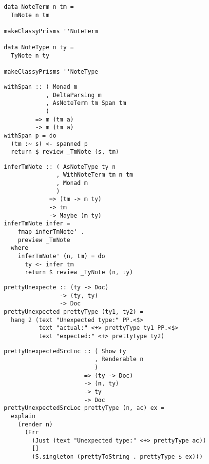 \documentclass{beamer}
\begin{document}
\begin{frame}[fragile]
  \begin{verbatim}
data NoteTerm n tm =
  TmNote n tm

makeClassyPrisms ''NoteTerm

data NoteType n ty =
  TyNote n ty

makeClassyPrisms ''NoteType
  \end{verbatim}
\end{frame} 

\begin{frame}[fragile]
  \begin{verbatim}
withSpan :: ( Monad m
            , DeltaParsing m
            , AsNoteTerm tm Span tm
            )
         => m (tm a)
         -> m (tm a)
withSpan p = do
  (tm :~ s) <- spanned p
  return $ review _TmNote (s, tm)
  \end{verbatim}
\end{frame} 

\begin{frame}[fragile]
  \begin{verbatim}
inferTmNote :: ( AsNoteType ty n
               , WithNoteTerm tm n tm
               , Monad m
               )
             => (tm -> m ty)
             -> tm
             -> Maybe (m ty)
inferTmNote infer =
    fmap inferTmNote' .
    preview _TmNote
  where
    inferTmNote' (n, tm) = do
      ty <- infer tm
      return $ review _TyNote (n, ty)
  \end{verbatim}
\end{frame} 

\begin{frame}[fragile]
  \begin{verbatim}
prettyUnexpecte :: (ty -> Doc)
                -> (ty, ty)
                -> Doc
prettyUnexpected prettyType (ty1, ty2) =
  hang 2 (text "Unexpected type:" PP.<$>
          text "actual:" <+> prettyType ty1 PP.<$>
          text "expected:" <+> prettyType ty2)
  \end{verbatim}
\end{frame} 

\begin{frame}[fragile]
  \begin{verbatim}
prettyUnexpectedSrcLoc :: ( Show ty
                          , Renderable n
                          )
                       => (ty -> Doc)
                       -> (n, ty)
                       -> ty
                       -> Doc
prettyUnexpectedSrcLoc prettyType (n, ac) ex =
  explain
    (render n)
      (Err 
        (Just (text "Unexpected type:" <+> prettyType ac)) 
        [] 
        (S.singleton (prettyToString . prettyType $ ex)))
  \end{verbatim}
\end{frame} 
\end{document}
